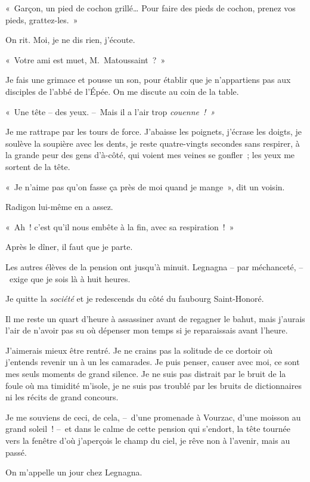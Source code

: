 \documentclass[french,twoside]{book} %
\begin{document}
« Garçon, un pied de cochon grillé… Pour faire des pieds de cochon, prenez vos pieds, grattez-les. »\par
On rit. Moi, je ne dis rien, j’écoute.\par
« Votre ami est muet, M. Matoussaint ? »\par
Je fais une grimace et pousse un son, pour établir que je n’appartiens pas aux disciples de l’abbé de l’Épée. On me discute au coin de la table.\par
« Une tête – des yeux. – Mais il a l’air trop \emph{couenne ! »}\par
Je me rattrape par les tours de force. J’abaisse les poignets, j’écrase les doigts, je soulève la soupière avec les dents, je reste quatre-vingts secondes sans respirer, à la grande peur des gens d’à-côté, qui voient mes veines se gonfler ; les yeux me sortent de la tête.\par
« Je n’aime pas qu’on fasse ça près de moi quand je mange », dit un voisin.\par
Radigon lui-même en a assez.\par
« Ah ! c’est qu’il nous embête à la fin, avec sa respiration ! »\par
\bigbreak
\noindent Après le dîner, il faut que je parte.\par
Les autres élèves de la pension ont jusqu’à minuit. Legnagna – par méchanceté, – exige que je sois là à huit heures.\par
Je quitte la \emph{société} et je redescends du côté du faubourg Saint-Honoré.\par
Il me reste un quart d’heure à assassiner avant de regagner le bahut, mais j’aurais l’air de n’avoir pas su où dépenser mon temps si je reparaissais avant l’heure.\par
J’aimerais mieux être rentré. Je ne crains pas la solitude de ce dortoir où j’entends revenir un à un les camarades. Je puis penser, causer avec moi, ce sont mes seuls moments de grand silence. Je ne suis pas distrait par le bruit de la foule où ma timidité m’isole, je ne suis pas troublé par les bruits de dictionnaires ni les récits de grand concours.\par
Je me souviens de ceci, de cela, – d’une promenade à Vourzac, d’une moisson au grand soleil ! – et dans le calme de cette pension qui s’endort, la tête tournée vers la fenêtre d’où j’aperçois le champ du ciel, je rêve non à l’avenir, mais au passé.\par
\bigbreak
\noindent On m’appelle un jour chez Legnagna.\par
\end{document}
